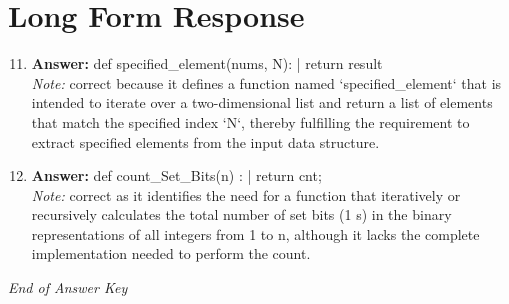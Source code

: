 \documentclass[12pt]{article}
\begin{document}
\section*{Long Form Response}
\begin{enumerate}[label=\arabic*.]
\setcounter{enumi}{10}
\item \textbf{Answer:} def specified\_element(nums, N): | return result
\\ \textit{Note:} correct because it defines a function named `specified\_element` that is intended to iterate over a two-dimensional list and return a list of elements that match the specified index `N`, thereby fulfilling the requirement to extract specified elements from the input data structure.
\item \textbf{Answer:} def count\_Set\_Bits(n) : | return cnt;
\\ \textit{Note:} correct as it identifies the need for a function that iteratively or recursively calculates the total number of set bits (1 s) in the binary representations of all integers from 1 to n, although it lacks the complete implementation needed to perform the count.
\end{enumerate}

\vfill
\noindent\textit{End of Answer Key}
\end{document}
